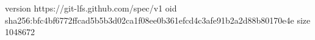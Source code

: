version https://git-lfs.github.com/spec/v1
oid sha256:bfc4bf6772ffcad5b5b3d02ca1f08ee0b361efcd4c3afe91b2a2d88b80170e4e
size 1048672
